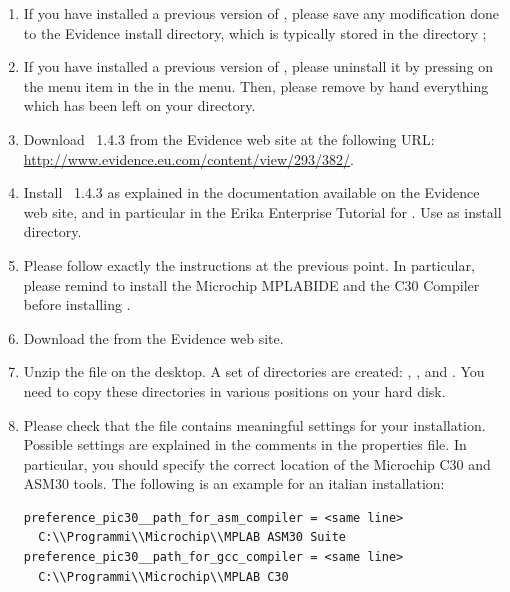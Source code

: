 \begin{enumerate}
\item If you have installed a previous version of \ee, please save any
  modification done to the Evidence install directory, which is
  typically stored in the directory
  ;
\item If you have installed a previous version of \ee, please
  uninstall it by pressing on the  menu item in the
  in the  menu. Then, please remove by hand everything
  which has been left on your  directory.
\item Download \ee\ 1.4.3 from the Evidence web site at the following URL:
  \url{http://www.evidence.eu.com/content/view/293/382/}.
\item Install \ee\ 1.4.3 as explained in the documentation available
  on the Evidence web site, and in particular in the Erika Enterprise
  Tutorial for \dspic. Use  as install directory.
\item Please follow exactly the instructions at the previous point. In
  particular, please remind to install the Microchip MPLABIDE and the
  C30 Compiler before installing \ee.
\item Download the  from the Evidence web site.
\item Unzip the file on the desktop. A set of directories are created:
  , , and . You need
  to copy these directories in various positions on your hard disk.
\item Please check that the file
  contains meaningful settings for your installation. Possible
  settings are explained in the comments in the properties file. In
  particular, you should specify the correct location of the Microchip
  C30 and ASM30 tools. The following is an example for an italian
  installation:
  \begin{lstlisting}
preference_pic30__path_for_asm_compiler = <same line>
  C:\\Programmi\\Microchip\\MPLAB ASM30 Suite
preference_pic30__path_for_gcc_compiler = <same line>
  C:\\Programmi\\Microchip\\MPLAB C30
  \end{lstlisting}


\end{enumerate}
